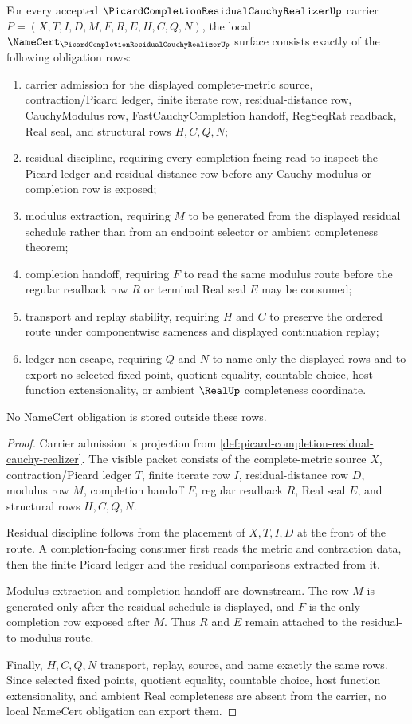 \begin{theorem}
\label{thm:picard-completion-residual-cauchy-realizer-namecert-obligations}
For every accepted $\PicardCompletionResidualCauchyRealizerUp$ carrier $P=(X,T,I,D,M,F,R,E,H,C,Q,N)$, the local $\NameCert_{\PicardCompletionResidualCauchyRealizerUp}$ surface consists exactly of the following obligation rows:
\begin{enumerate}
\item carrier admission for the displayed complete-metric source, contraction/Picard ledger, finite iterate row, residual-distance row, CauchyModulus row, FastCauchyCompletion handoff, RegSeqRat readback, Real seal, and structural rows $H,C,Q,N$;
\item residual discipline, requiring every completion-facing read to inspect the Picard ledger and residual-distance row before any Cauchy modulus or completion row is exposed;
\item modulus extraction, requiring $M$ to be generated from the displayed residual schedule rather than from an endpoint selector or ambient completeness theorem;
\item completion handoff, requiring $F$ to read the same modulus route before the regular readback row $R$ or terminal Real seal $E$ may be consumed;
\item transport and replay stability, requiring $H$ and $C$ to preserve the ordered route under componentwise sameness and displayed continuation replay;
\item ledger non-escape, requiring $Q$ and $N$ to name only the displayed rows and to export no selected fixed point, quotient equality, countable choice, host function extensionality, or ambient $\RealUp$ completeness coordinate.
\end{enumerate}
No NameCert obligation is stored outside these rows.
\end{theorem}
\begin{proof}
Carrier admission is projection from \autoref{def:picard-completion-residual-cauchy-realizer}. The visible packet consists of the complete-metric source $X$, contraction/Picard ledger $T$, finite iterate row $I$, residual-distance row $D$, modulus row $M$, completion handoff $F$, regular readback $R$, Real seal $E$, and structural rows $H,C,Q,N$.

Residual discipline follows from the placement of $X,T,I,D$ at the front of the route. A completion-facing consumer first reads the metric and contraction data, then the finite Picard ledger and the residual comparisons extracted from it.

Modulus extraction and completion handoff are downstream. The row $M$ is generated only after the residual schedule is displayed, and $F$ is the only completion row exposed after $M$. Thus $R$ and $E$ remain attached to the residual-to-modulus route.

Finally, $H,C,Q,N$ transport, replay, source, and name exactly the same rows. Since selected fixed points, quotient equality, countable choice, host function extensionality, and ambient Real completeness are absent from the carrier, no local NameCert obligation can export them.
\end{proof}
